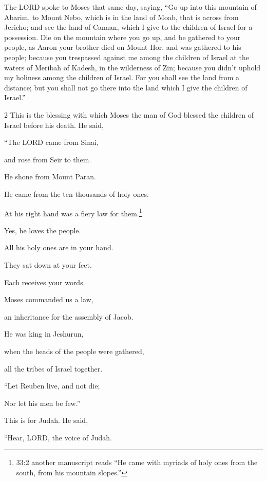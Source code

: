 \myverse{}The LORD spoke to Moses that same day, saying,
\myverse{}“Go up into this mountain of Abarim, to Mount Nebo, which is in the land
of Moab, that is across from Jericho; and see the land of Canaan, which I give to the children of Israel
for a possession.
\myverse{}Die on the mountain where you go up, and be gathered to your people, as Aaron
your brother died on Mount Hor, and was gathered to his people;
\myverse{}because you trespassed against me among the children of Israel at the waters
of Meribah of Kadesh, in the wilderness of Zin; because you didn’t uphold my holiness among the children
of Israel.
\myverse{}For you shall see the land from a distance; but you shall not go there into
the land which I give the children of Israel.”


\mychapter{} 
\begin{multicols}{2}
\myverse*{}This is the blessing with which Moses the man of God blessed the
children of Israel before his death.
\myverse{}He said,

“The LORD came from Sinai,

and rose from Seir to them.

He shone from Mount Paran.

He came from the ten thousands of holy ones.

At his right hand was a fiery law for them.\footnote{33:2 another manuscript reads “He came with myriads of holy ones from the south, from his mountain
	slopes.”}

\myverse{}Yes, he loves the people.

All his holy ones are in your hand.

They sat down at your feet.

Each receives your words.

\myverse{}Moses commanded us a law,

an inheritance for the assembly of Jacob.

\myverse{}He was king in Jeshurun,

when the heads of the people were gathered,

all the tribes of Israel together.


\vspace{\baselineskip} \myverse{}“Let Reuben live, and not die;

Nor let his men be few.”

\myverse{}This is for Judah. He said,

“Hear, LORD, the voice of Judah.


\end{multicols}
